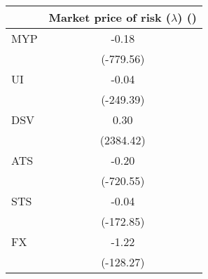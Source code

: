 \begin{tabular}{l*{1}{c}}
\hline
\hline
& Market price of risk ($\lambda$) (\times 100)\\
\hline
MYP & -0.18\\
   & (-779.56)\\
UI & -0.04\\
   & (-249.39)\\
DSV & 0.30\\
   & (2384.42)\\
ATS & -0.20\\
   & (-720.55)\\
STS & -0.04\\
   & (-172.85)\\
FX & -1.22\\
   & (-128.27)\\
\hline
\hline
\end{tabular}
